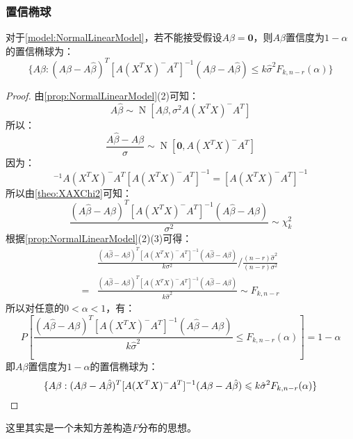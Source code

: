\subsubsection{置信椭球}
\begin{theorem}\label{theo:NormalLinearModelConfidenceEllipsoid}
	对于\cref{model:NormalLinearModel}，若不能接受假设$A\beta=\mathbf{0}$，则$A\beta$置信度为$1-\alpha$的置信椭球为：
	\begin{equation*}
		\{A\beta:(A\beta-A\hat{\beta})^T[A(X^TX)^-A^T]^{-1}(A\beta-A\hat{\beta})\leqslant k\hat{\sigma}^2F_{k,n-r}(\alpha)\}
	\end{equation*}
\end{theorem}
\begin{proof}
	由\cref{prop:NormalLinearModel}(2)可知：
	\begin{equation*}
		A\hat{\beta}\sim\operatorname{N}[A\beta,\sigma^2A(X^TX)^-A^T]
	\end{equation*}
	所以：
	\begin{equation*}
		\frac{A\hat{\beta}-A\beta}{\sigma}\sim\operatorname{N}[\mathbf{0},A(X^TX)^-A^T]
	\end{equation*}
	因为：
	\begin{equation*}
		[A(X^TX)^-A^T]^{-1}A(X^TX)^-A^T[A(X^TX)^-A^T]^{-1}=[A(X^TX)^-A^T]^{-1}
	\end{equation*}
	所以由\cref{theo:XAXChi2}可知：
	\begin{equation*}
		\frac{(A\hat{\beta}-A\beta)^T[A(X^TX)^-A^T]^{-1}(A\hat{\beta}-A\beta)}{\sigma^2}\sim\chi_{k}^2
	\end{equation*}
	根据\cref{prop:NormalLinearModel}(2)(3)可得：
	\begin{align*}
		&\frac{(A\hat{\beta}-A\beta)^T[A(X^TX)^-A^T]^{-1}(A\hat{\beta}-A\beta)}{k\sigma^2}\Big/\frac{(n-r)\hat{\sigma}^2}{(n-r)\sigma^2} \\
		=&\frac{(A\hat{\beta}-A\beta)^T[A(X^TX)^-A^T]^{-1}(A\hat{\beta}-A\beta)}{k\hat{\sigma}^2}\sim F_{k,n-r}
	\end{align*}
	所以对任意的$0<\alpha<1$，有：
	\begin{equation*}
		P\left[\frac{(A\hat{\beta}-A\beta)^T[A(X^TX)^-A^T]^{-1}(A\hat{\beta}-A\beta)}{k\hat{\sigma}^2}\leqslant F_{k,n-r}(\alpha)\right]=1-\alpha
	\end{equation*}
	即$A\beta$置信度为$1-\alpha$的置信椭球为：
	\begin{equation*}
		\{A\beta:(A\beta-A\hat{\beta})^T[A(X^TX)^-A^T]^{-1}(A\beta-A\hat{\beta})\leqslant k\hat{\sigma}^2F_{k,n-r}(\alpha)\}\qedhere
	\end{equation*}
\end{proof}
\begin{note}
	这里其实是一个未知方差构造$F$分布的思想。
\end{note}
